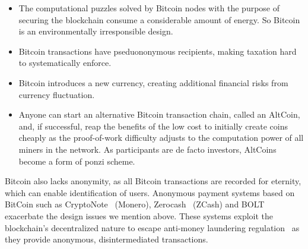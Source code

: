 \documentclass{llncs}
\begin{document}
\begin{itemize}
  \item The computational puzzles solved by Bitcoin nodes with the purpose
    of securing the blockchain consume a considerable amount of energy.
    So Bitcoin is an environmentally irresponsible design.
  \item Bitcoin transactions have pseduononymous recipients, making taxation
    hard to systematically enforce.
  \item Bitcoin introduces a new currency, creating additional
    financial risks from currency fluctuation.
  \item Anyone can start an alternative Bitcoin transaction chain,
    called an AltCoin, and, if successful, reap the benefits of the low
    cost to initially create coins cheaply as the proof-of-work
    difficulty adjusts to the computation power of all
    miners in the network.  As participants are
    de facto investors, AltCoins become a form of ponzi scheme.
\end{itemize}

Bitcoin also lacks anonymity, as all Bitcoin transactions are recorded
for eternity, which can enable identification of users.  Anonymous
payment systems based on BitCoin such as CryptoNote~\cite{cryptonote}
(Monero), Zerocash~\cite{zerocash} (ZCash) and BOLT~\cite{BOLT}
exacerbate the design issues we mention above.  These systems exploit the
blockchain's decentralized nature to escape anti-money laundering
regulation~\cite{molander1998cyberpayments} as they provide anonymous,
disintermediated transactions.


\end{document}
